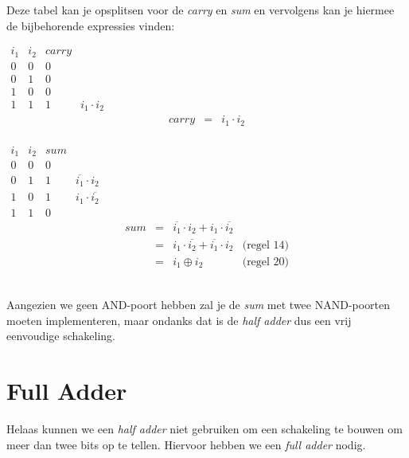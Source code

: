 \documentclass[11pt,a5paper]{report}
\begin{document}
Deze tabel kan je opsplitsen voor de \textit{carry} en \textit{sum} en vervolgens kan je hiermee de bijbehorende expressies vinden:

\begin{minipage}[t]{0.50\textwidth}
\centering
\vspace*{-1em}
\(
\begin{array}{cc|cl}
i_1 & i_2 & carry \\
\hline
0 & 0 & 0&\\
0 & 1 & 0&\\
1 & 0 & 0&\\
1 & 1 & 1& i_1 \cdot i_2
\end{array}
\)
\[
\begin{array}{rcll}
carry &=& i_1\cdot i_2 \\
\end{array}
\]
\end{minipage}%
\hfill
\begin{minipage}[t]{0.50\textwidth}
\centering
\vspace*{-1em}
\(
\begin{array}{cc|cl}
i_1 & i_2 & sum \\
\hline
0 & 0 & 0&\\
0 & 1 & 1&\overline{i_1}\cdot i_2\\
1 & 0 & 1&i_1\cdot\overline{i_2}\\
1 & 1 & 0&
\end{array}
\)
\[
\begin{array}{rcll}
sum &=& \overline{i_1}\cdot i_2 + i_1\cdot\overline{i_2} \\
        &=& i_1\cdot\overline{i_2} + \overline{i_1}\cdot i_2 & \text{(regel 14)}\\
        &=& i_1 \oplus i_2 &\text {(regel 20)}
\end{array}
\]
\end{minipage}\\

Aangezien we geen AND-poort hebben zal je de \textit{sum} met twee NAND-poorten moeten implementeren, maar ondanks dat is de \textit{half adder} dus een vrij eenvoudige schakeling.

\newpage
\section*{Full Adder}
Helaas kunnen we een \textit{half adder} niet gebruiken om een schakeling te bouwen om meer dan twee bits op te tellen. Hiervoor hebben we een \textit{full adder} nodig.
\end{document}
